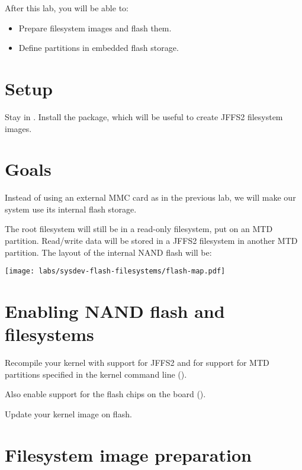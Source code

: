 
After this lab, you will be able to:
\begin{itemize}
\item Prepare filesystem images and flash them.
\item Define partitions in embedded flash storage.
\end{itemize}

\section{Setup}

Stay in . Install the
 package, which will be useful to create JFFS2
filesystem images.

\section{Goals}

Instead of using an external MMC card as in the previous lab, we will
make our system use its internal flash storage.

The root filesystem will still be in a read-only filesystem, put on an
MTD partition.  Read/write data will be stored in a JFFS2 filesystem
in another MTD partition. The layout of the internal NAND flash will
be:

\begin{center}
  \texttt{[image: labs/sysdev-flash-filesystems/flash-map.pdf]}
\end{center}

\section{Enabling NAND flash and filesystems}

Recompile your kernel with support for JFFS2 and for support for MTD
partitions specified in the kernel command line
().

Also enable support for the flash chips on the board
().

Update your kernel image on flash.

\section{Filesystem image preparation}

